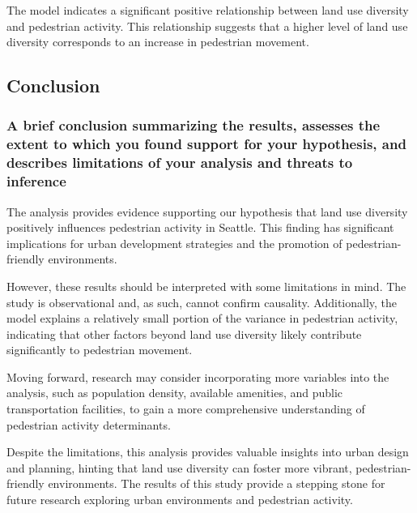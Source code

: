 \documentclass[
]{article}
\begin{document}
The model indicates a significant positive relationship between land use
diversity and pedestrian activity. This relationship suggests that a
higher level of land use diversity corresponds to an increase in
pedestrian movement.

\hypertarget{conclusion}{%
\subsection{Conclusion}\label{conclusion}}

\hypertarget{a-brief-conclusion-summarizing-the-results-assesses-the-extent-to-which-you-found-support-for-your-hypothesis-and-describes-limitations-of-your-analysis-and-threats-to-inference}{%
\subsubsection{A brief conclusion summarizing the results, assesses the
extent to which you found support for your hypothesis, and describes
limitations of your analysis and threats to
inference}\label{a-brief-conclusion-summarizing-the-results-assesses-the-extent-to-which-you-found-support-for-your-hypothesis-and-describes-limitations-of-your-analysis-and-threats-to-inference}}

The analysis provides evidence supporting our hypothesis that land use
diversity positively influences pedestrian activity in Seattle. This
finding has significant implications for urban development strategies
and the promotion of pedestrian-friendly environments.

However, these results should be interpreted with some limitations in
mind. The study is observational and, as such, cannot confirm causality.
Additionally, the model explains a relatively small portion of the
variance in pedestrian activity, indicating that other factors beyond
land use diversity likely contribute significantly to pedestrian
movement.

Moving forward, research may consider incorporating more variables into
the analysis, such as population density, available amenities, and
public transportation facilities, to gain a more comprehensive
understanding of pedestrian activity determinants.

Despite the limitations, this analysis provides valuable insights into
urban design and planning, hinting that land use diversity can foster
more vibrant, pedestrian-friendly environments. The results of this
study provide a stepping stone for future research exploring urban
environments and pedestrian activity.
\end{document}
